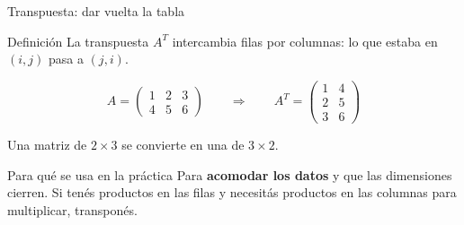 \documentclass[aspectratio=169,10pt]{beamer}
\begin{document}
\begin{frame}{Transpuesta: dar vuelta la tabla}

\begin{block}{Definición}
La transpuesta $A^T$ intercambia filas por columnas: lo que estaba en $(i,j)$ pasa a $(j,i)$.
\end{block}

\vspace{0.3cm}
$$A = \begin{pmatrix} 1 & 2 & 3 \\ 4 & 5 & 6 \end{pmatrix}
\qquad \Longrightarrow \qquad
A^T = \begin{pmatrix} 1 & 4 \\ 2 & 5 \\ 3 & 6 \end{pmatrix}$$

\vspace{0.3cm}
\begin{center}
Una matriz de $2 \times 3$ se convierte en una de $3 \times 2$.
\end{center}

\vspace{0.3cm}
\begin{block}{Para qué se usa en la práctica}
Para \textbf{acomodar los datos} y que las dimensiones cierren. Si tenés productos en las filas y
necesitás productos en las columnas para multiplicar, transponés.
\end{block}
\end{frame}
\end{document}
